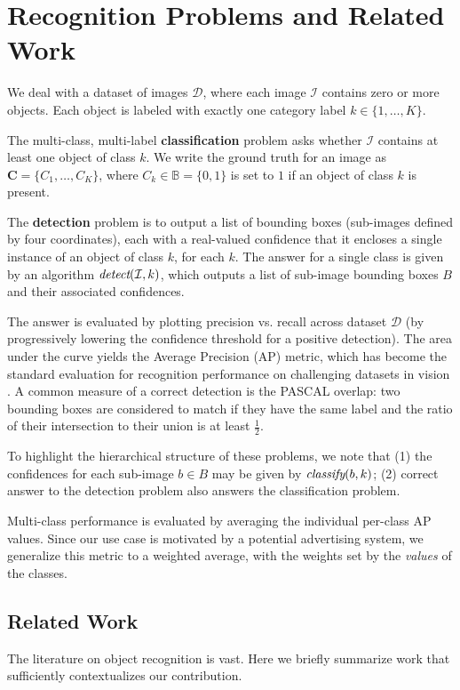 \section{Recognition Problems and Related Work}

We deal with a dataset of images $\mathcal{D}$, where each image $\mathcal{I}$ contains zero or more objects.
Each object is labeled with exactly one category label $k \in \{1, \dots, K\}$.

The multi-class, multi-label \textbf{classification} problem asks whether $\mathcal{I}$ contains at least one object of class $k$.
We write the ground truth for an image as $\mathbf{C}=\{C_1,\dots,C_K\}$, where $C_k \in \mathbb{B} = \{0,1\}$ is set to $1$ if an object of class $k$ is present.

The \textbf{detection} problem is to output a list of bounding boxes (sub-images defined by four coordinates), each with a real-valued confidence that it encloses a single instance of an object of class $k$, for each $k$.
The answer for a single class is given by an algorithm $\emph{detect}(\mathcal{I},k)$, which outputs a list of sub-image bounding boxes $B$ and their associated confidences.

The answer is evaluated by plotting precision vs. recall across dataset $\mathcal{D}$ (by progressively lowering the confidence threshold for a positive detection).
The area under the curve yields the Average Precision (AP) metric, which has become the standard evaluation for recognition performance on challenging datasets in vision \cite{pascal-voc-2010}.
A common measure of a correct detection is the PASCAL overlap: two bounding boxes are considered to match if they have the same label and the ratio of their intersection to their union is at least $\frac{1}{2}$.

To highlight the hierarchical structure of these problems, we note that (1) the confidences for each sub-image $b \in B$ may be given by $\emph{classify}(b,k)$; (2) correct answer to the detection problem also answers the classification problem.

Multi-class performance is evaluated by averaging the individual per-class AP values.
Since our use case is motivated by a potential advertising system, we generalize this metric to a weighted average, with the weights set by the \emph{values} of the classes.

\subsection{Related Work}
The literature on object recognition is vast.
Here we briefly summarize work that sufficiently contextualizes our contribution.

